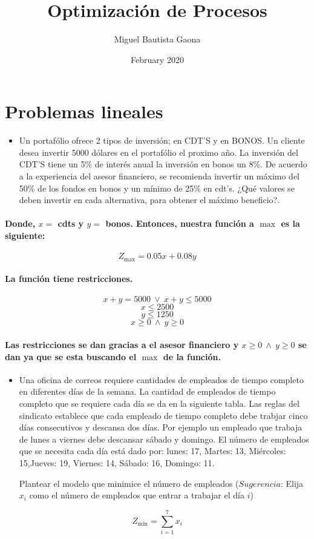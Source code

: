 \documentclass{article}
\title{Optimización de Procesos}
\author{Miguel Bautista Gaona}
\date{February 2020}
\begin{document}
\maketitle
\section{Problemas lineales}
\begin{itemize}
    \item Un portafólio ofrece 2 tipos de inversión; en CDT'S y en BONOS. Un cliente desea invertir 5000 dólares en el portafólio el proximo año. La inversión del CDT'S tiene un 5\% de interés anual la inversión en bonos un 8\%. De acuerdo a la experiencia del asesor financiero, se recomienda invertir un máximo del 50\% de los fondos en bonos y un mínimo de 25\% en cdt's. ¿Qué valores se deben invertir en cada alternativa, para obtener el máximo beneficio?. 
\end{itemize}
\paragraph{Donde, $x = $ cdts y $y = $ bonos. Entonces, nuestra función a $\max$ es la siguiente: }

$$Z_{\max} = 0.05 x + 0.08 y $$

\paragraph{La función tiene restricciones.}

$$ x + y  = 5000 \ \vee \ x + y \leq  5000 $$
$$x \leq 2500$$
$$y \leq 1250$$
$$ x \geq  0 \ \wedge \ y \geq 0 $$

\paragraph{Las restricciones se dan gracias a el asesor financiero y $ x \geq  0 \ \wedge \ y \geq 0 $ se dan ya que se esta buscando el $\max$ de la función.}

\begin{itemize}
    \item Una oficina de correos requiere cantidades de empleados de tiempo completo en diferentes días de la semana. La cantidad de empleados de tiempo completo que se requiere cada día se da en la siguiente tabla. Las reglas del sindicato establece que cada empleado de tiempo completo debe trabjar cinco días consecutivos y descansa dos días. Por ejemplo un empleado que trabaja de lunes a viernes debe descansar sábado y domingo. El número de empleados que se necesita cada día está dado por: 
    lunes: 17, Martes: 13, Miércoles: 15,Jueves: 19, Viernes: 14, Sábado: 16, Domingo: 11. 
    
    
    
    Plantear el modelo que minimice el número de empleados ($Sugerencia$:  Elija $x_{i}$ como el número de empleados que entrar a trabajar el día $i$)
\end{itemize}
$$Z_{\min} = \sum _{i = 1}^{7} x_{i}$$
\end{document}
